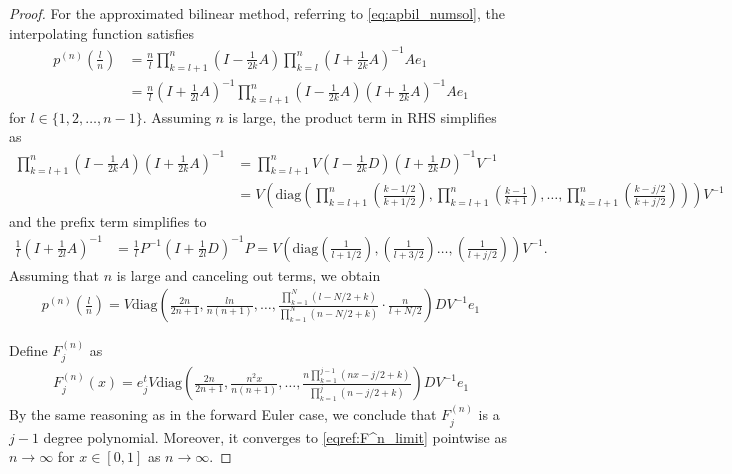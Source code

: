 \documentclass{article}
\theoremstyle{definition}
\newcommand{\pr}[1]{ \left( #1 \right) }
\begin{document}
\begin{proof}
    For the approximated bilinear method, 
    referring to \eqref{eq:apbil_numsol}, the interpolating function satisfies
     \begin{align*}
         p^{(n)}\pr{\frac{l}{n}} &= \frac{n}{l}
         \prod_{k=l+1}^n 
         \pr{I - \frac{1}{2k}A}
         \prod_{k=l}^n 
         \pr{I + \frac{1}{2k}A}^{-1}
         Ae_1 \\
         &= \frac{n}{l}
         \pr{ I + \frac{1}{2l}A}^{-1}
         \prod_{k=l+1}^n 
         \pr{I - \frac{1}{2k}A} \pr{I + \frac{1}{2k}A}^{-1}
         Ae_1
     \end{align*}
     for $l \in \{1, 2, \dots, n-1\}$. 
     Assuming $n$ is large, the product term in RHS simplifies as
     \begin{align*}
         \prod_{k=l+1}^n 
         \pr{I - \frac{1}{2k}A} \pr{I + \frac{1}{2k}A}^{-1}
        &= \prod_{k=l+1}^n V 
         \pr{I - \frac{1}{2k}D} \pr{I + \frac{1}{2k}D}^{-1} V^{-1} \\
        &= V \pr{ \text{diag}
        \pr{ \prod_{k=l+1}^{n}\pr{ \frac{k-1/2}{k+1/2} }, \prod_{k=l+1}^{n}\pr{ \frac{k-1}{k+1} }, \dots, \prod_{k=l+1}^{n}\pr{ \frac{k - j/2}{k + j/2}}}}
        V^{-1}
     \end{align*}
     and the prefix term simplifies to
     \begin{align*}
         \frac{1}{l}\pr{ I + \frac{1}{2l}A}^{-1} 
         &= \frac{1}{l} P^{-1} \pr{ I + \frac{1}{2l}D}^{-1} P 
         = V \pr{ \text{diag} \pr{\frac{1}{l+1/2}}, \pr{\frac{1}{l+3/2}} \dots,
         \pr{\frac{1}{l+j/2}} }V^{-1}.
     \end{align*}
     Assuming that $n$ is large and canceling out terms, we obtain
    \begin{align*}
        p^{(n)}\pr{\frac{l}{n}} 
        = V \text{diag}
        \pr{ \frac{2n}{2n+1}, \frac{ln}{n(n+1)}, \dots, \frac{\prod_{k=1}^{N}\pr{ l - N/2 + k } }{{\prod_{k=1}^{N}\pr{ n - N/2 + k}}} 
        \cdot \frac{n}{l+N/2} } D V^{-1} e_1
    \end{align*}
    
    Define $F_j^{(n)}$ as 
     \begin{align*}
          F_j^{(n)}\pr{x} 
        = e_j^t V \text{diag}
        \pr{ \frac{2n}{2n+1}, \frac{n^2x}{n(n+1)}, \dots, \frac{n\prod_{k=1}^{j-1}\pr{ nx - j/2 + k } }{{\prod_{k=1}^{j}\pr{ n - j/2 + k}}}} D V^{-1} e_1
     \end{align*}
     By the same reasoning as in the forward Euler case, we conclude that $F_j^{(n)}$ is a $j-1$ degree polynomial. Moreover, it converges to \eqref{eqref:F^n_limit} pointwise as $n \to \infty$ for $x \in [0,1]$ as $n \to \infty$.


\end{proof}
\end{document}
